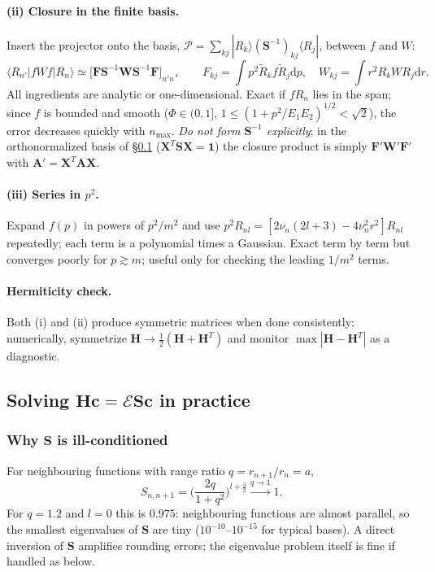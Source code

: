 \documentclass[11pt,a4paper]{article}
\numberwithin{equation}{section}
\theoremstyle{definition}
\theoremstyle{plain}
\theoremstyle{remark}
\numberwithin{algorithm}{section}
\newcommand{\dd}{\mathrm{d}}
\newcommand{\bra}[1]{\langle #1|}
\newcommand{\ket}[1]{|#1\rangle}
\newcommand{\ME}[3]{\langle #1|#2|#3\rangle}
\newcommand{\mH}{\mathbf H}
\newcommand{\mS}{\mathbf S}
\newcommand{\mX}{\mathbf X}
\newcommand{\vc}{\bm c}
\begin{document}
\paragraph{(ii) Closure in the finite basis.} Insert the projector onto the basis, $\mathcal P=\sum_{kj}\ket{R_k}(\mS^{-1})_{kj}\bra{R_j}$, between $f$ and $W$:
\begin{equation}
\ME{R_{n'}}{fWf}{R_n}\simeq\big[\mathbf F\mS^{-1}\mathbf W\mS^{-1}\mathbf F\big]_{n'n},\qquad F_{kj}=\int p^2\tilde R_kf\tilde R_j\dd p,\quad W_{kj}=\int r^2R_kWR_j\dd r .
\end{equation}
All ingredients are analytic or one-dimensional. Exact if $fR_n$ lies in the span; since $f$ is bounded and smooth ($\Phi\in(0,1]$, $1\le(1+p^2/E_1E_2)^{1/2}<\sqrt2$), the error decreases quickly with $n_{\max}$. \emph{Do not form $\mS^{-1}$ explicitly}; in the orthonormalized basis of \S\ref{sec:solve} ($\mX^T\mS\mX=\mathbf 1$) the closure product is simply $\mathbf F'\mathbf W'\mathbf F'$ with $\mathbf A'=\mX^T\mathbf A\mX$.

\paragraph{(iii) Series in $p^2$.} Expand $f(p)$ in powers of $p^2/m^2$ and use $p^2R_{nl}=[2\nu_n(2l+3)-4\nu_n^2r^2]R_{nl}$ repeatedly; each term is a polynomial times a Gaussian. Exact term by term but converges poorly for $p\gtrsim m$; useful only for checking the leading $1/m^2$ terms.

\paragraph{Hermiticity check.} Both (i) and (ii) produce symmetric matrices when done consistently; numerically, symmetrize $\mH\to\frac12(\mH+\mH^T)$ and monitor $\max|\mH-\mH^T|$ as a diagnostic.

\subsection{\texorpdfstring{Solving $\mH\vc=\mathcal E\mS\vc$ in practice}{Solving the generalized eigenproblem in practice}}\label{sec:solve}
\subsubsection{\texorpdfstring{Why $\mS$ is ill-conditioned}{Why S is ill-conditioned}}
For neighbouring functions with range ratio $q=r_{n+1}/r_n=a$,
\begin{equation}
S_{n,n+1}=\Big(\frac{2q}{1+q^2}\Big)^{l+\frac32}\xrightarrow{q\to1}1 .
\end{equation}
For $q=1.2$ and $l=0$ this is $0.975$: neighbouring functions are almost parallel, so the smallest eigenvalues of $\mS$ are tiny ($10^{-10}$--$10^{-15}$ for typical bases). A direct inversion of $\mS$ amplifies rounding errors; the eigenvalue problem itself is fine if handled as below.
\end{document}
